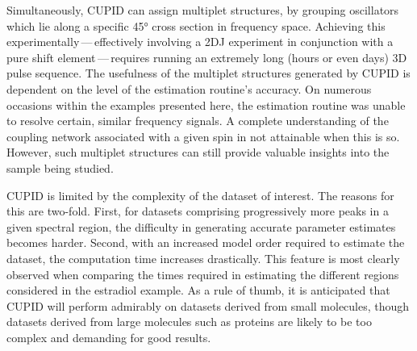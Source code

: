 Simultaneously, \ac{CUPID} can assign multiplet structures,
by grouping oscillators which lie along a specific \ang{45} cross section in
frequency space. Achieving this experimentally\,---\,effectively involving
a \ac{2DJ} experiment in conjunction with a pure shift element\,---\,requires
running an extremely long (hours or even days) \ac{3D} pulse sequence. The
usefulness of the multiplet structures generated by \ac{CUPID} is dependent on
the level of the estimation routine's accuracy. On
numerous occasions within the examples presented here, the estimation routine
was unable to resolve certain, similar frequency signals. A complete
understanding of the coupling network associated with a given spin in not
attainable when this is so. However, such multiplet structures can still provide
valuable insights into the sample being studied.

\ac{CUPID} is limited by the complexity of the dataset of interest. The reasons
for this are two-fold. First, for datasets comprising progressively more peaks
in a given spectral region, the difficulty in generating accurate parameter
estimates becomes harder. Second, with an increased model order required to
estimate the dataset, the computation time increases drastically.
This feature is most clearly observed when comparing the times required in
estimating the different regions considered in the estradiol example. As a rule
of thumb, it is anticipated that \ac{CUPID} will perform admirably on datasets
derived from small molecules, though datasets derived from large molecules such
as proteins are likely to be too complex and demanding for good results.

